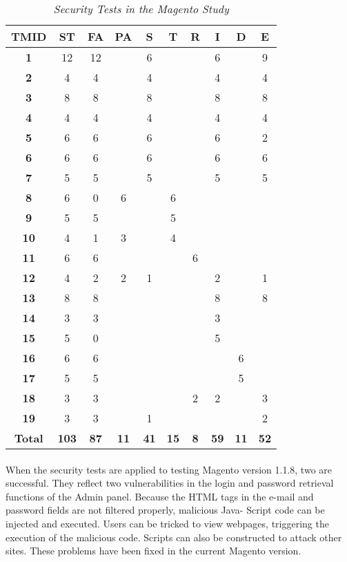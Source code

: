 \begin{table}
\label{Table:3}
\centering
\begin{tabular}{|c|c|c|c|c|c|c|c|c|c|}
\hline
\textbf{TMID}&\textbf{ST}&\textbf{FA}&\textbf{PA}&\textbf{S}&\textbf{T}&\textbf{R}&\textbf{I}&\textbf{D}&\textbf{E}
\\
\hline
\textbf{1} & 12 & 12 &  & 6 &  & & 6 & &9
\\
\hline
\textbf{2} & 4 & 4 &  & 4 &  & & 4 & &4
\\
\hline
\textbf{3} & 8 & 8 &  & 8 &  &  & 8 & & 8
\\
\hline
\textbf{4} & 4 & 4 &  & 4 &  &  & 4 & & 4
\\
\hline
\textbf{5} & 6 & 6 &  & 6 &  &  & 6 & & 2
\\
\hline
\textbf{6} & 6 & 6 &  & 6 &  &  & 6 & & 6
\\
\hline
\textbf{7} & 5 & 5 &  & 5 &  &  & 5 & & 5
\\
\hline
\textbf{8} & 6 & 0 & 6 &  & 6 &  &  & & 
\\
\hline
\textbf{9} & 5 & 5 &  &  & 5 & &  & &
\\
\hline
\textbf{10} & 4 & 1 & 3 &  & 4 & &  & &
\\
\hline
\textbf{11} & 6 & 6 &  &  &  & 6 &  & & 
\\
\hline
\textbf{12} & 4 & 2 & 2 & 1 &  &  & 2 & & 1
\\
\hline
\textbf{13} & 8 & 8 &  &  &  &  & 8 & & 8
\\
\hline
\textbf{14} & 3 & 3 &  &  &  &  & 3 & & 
\\
\hline
\textbf{15} & 5 & 0 &  &  &  &  & 5 & & 
\\
\hline
\textbf{16} & 6 & 6 &  &  &  &  &  & 6 & 
\\
\hline
\textbf{17} & 5 & 5 &  &  &  &  &  & 5 & 
\\
\hline
\textbf{18} & 3 & 3 &  &  &  & 2 & 2 & & 3 
\\
\hline
\textbf{19} & 3 & 3 &  & 1 &  &  &  &  & 2 
\\
\hline

\textbf{Total} & \textbf{103} & \textbf{87} & \textbf{11} & \textbf{41} & \textbf{15} &\textbf{8} & \textbf{59} & \textbf{11}  &\textbf{52}
\\
\hline
\end{tabular}
\caption{\textit{Security Tests in the Magento Study}}
\end{table}

\paragraph*{}
When the security tests are applied to testing Magento
version 1.1.8, two are successful. They reflect two vulnerabilities
in the login and password retrieval functions of the
Admin panel. Because the HTML tags in the e-mail and
password fields are not filtered properly, malicious Java-
Script code can be injected and executed. Users can be
tricked to view webpages, triggering the execution of the
malicious code. Scripts can also be constructed to attack
other sites. These problems have been fixed in the current
Magento version.
